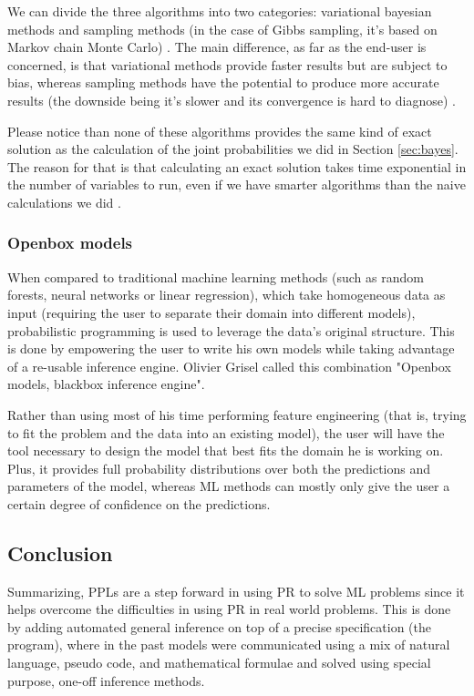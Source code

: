 \begin{itemsize}
We can divide the three algorithms into two categories: variational bayesian
methods \cite{Winn2005}\cite{Minka1999} and sampling methods (in the case of Gibbs
sampling, it's based on Markov chain Monte Carlo) \cite{Andrieu2003}. The main
difference, as far as the end-user is concerned, is that variational methods
provide faster results but are subject to bias, whereas sampling methods have
the potential to produce more accurate results (the downside being it's slower
and its convergence is hard to diagnose) \cite{Shen2010}.

Please notice than none of these algorithms provides the same kind of exact
solution as the calculation of the joint probabilities we did in Section
\ref{sec:bayes}. The reason for that is that calculating an exact solution
takes time exponential in the number of variables to run, even if we have smarter
algorithms than the naive calculations we did \cite{Zhang1994}.

\subsubsection{Openbox models}

When compared to traditional machine learning methods (such as random forests, neural
networks or linear regression), which take homogeneous data as input (requiring
the user to separate their domain into different models), probabilistic
programming is used to leverage the data’s original structure. This is done by
empowering the user to write his own models while taking advantage of a re-usable
inference engine. Olivier Grisel called this combination "Openbox models,
blackbox inference engine"\cite{SciPy}.

Rather than using most of his
time performing feature engineering (that is, trying to fit the problem and the
data into an existing model), the user will have the tool necessary to design
the model that best fits the domain he is working on.
Plus, it provides full probability distributions over both the predictions and parameters of the
model, whereas ML methods can mostly only give the user a certain degree of confidence
on the predictions.

\subsection{Conclusion}

Summarizing, PPLs are a step forward in using PR to solve ML problems since
it helps overcome the difficulties in using PR in real world problems. This is
done by adding automated general inference on top of a precise specification
(the program), where in the past models were communicated
using a mix of natural language, pseudo code, and mathematical formulae and solved
using special purpose, one-off inference methods.


\end{itemsize}
